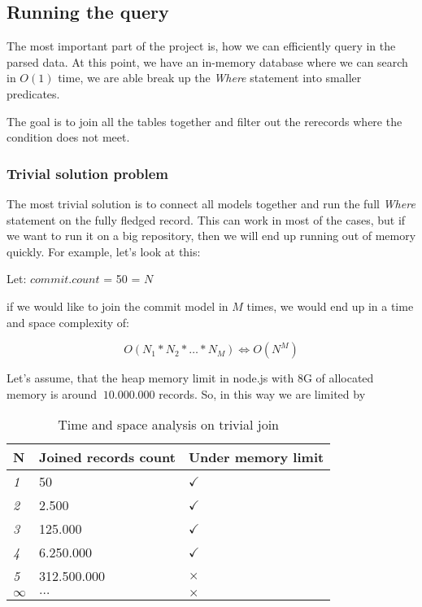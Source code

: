 \subsection{Running the query}

The most important part of the project is, how we can efficiently query in the parsed data. At this point, we have an in-memory database where we can search in \(O(1)\) time, we are able break up the \textit{Where} statement into smaller predicates.

The goal is to join all the tables together and filter out the rerecords where the condition does not meet.

\subsubsection{Trivial solution problem}
The most trivial solution is to connect all models together and run the full \textit{Where} statement on the fully fledged record. This can work in most of the cases, but if we want to run it on a big repository, then we will end up running out of memory quickly. For example, let’s look at this:

Let: $commit.count$ = 50 = $N$

if we would like to join the commit model in $M$ times, we would end up in a time and space complexity of:

\[ O(N_1 * N_2 * \dots * N_M ) \Leftrightarrow O(N^M) \]

Let’s assume, that the heap memory limit in node.js with 8G of allocated memory is around $~10.000.000$ records. So, in this way we are limited by

\begin{table}[H]
	\centering
	\begin{tabular}{ | m{} | m{} | m{} | }
		\hline
		\textbf{N} & \textbf{Joined records count} & \textbf{Under memory limit} \\
		\hline \hline
		\emph{1} & 50 & $\checkmark$ \\
		\hline
		\emph{2} & 2.500 & $\checkmark$ \\
		\hline
		\emph{3} & 125.000 & $\checkmark$ \\
		\hline
		\emph{4} & 6.250.000 & $\checkmark$ \\
		\hline
		\emph{5} & 312.500.000 & $\times$ \\
		\hline
		\emph{$\infty$} & $\dots$ & $\times$ \\
		\hline
	\end{tabular}
	\caption{Time and space analysis on trivial join}
	\label{tab:tsj-1}
\end{table}

